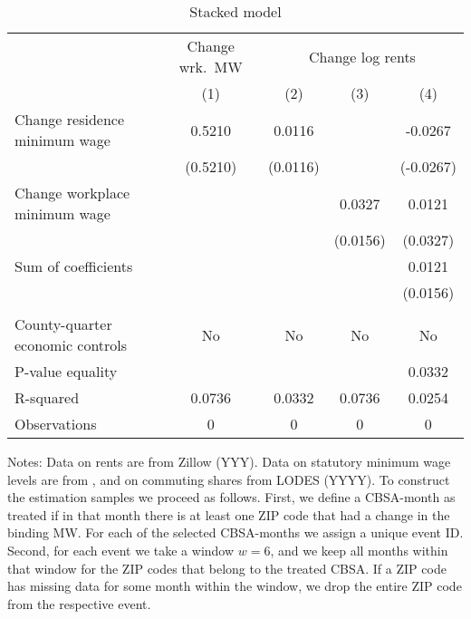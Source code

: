 \begin{table}[hbt!] \centering
	\caption{Stacked model}
	\label{tab:stacked}
	\begin{tabular}{l*{4}{c}}
		\toprule
		& \multicolumn{1}{c}{Change wrk.\ MW}
		& \multicolumn{3}{c}{Change log rents}                            \\ \cmidrule(lr){2-2}\cmidrule(lr){3-5}
		& (1)   & (2)   & (3)   & (4)      \\ \midrule
		Change residence minimum wage      &  0.5210  &  0.0116  &       &  -0.0267     \\
		& (0.5210) & (0.0116) &       & (-0.0267)    \\
		Change workplace minimum wage      &       &       &  0.0327  & 0.0121      \\
		&       &       & (0.0156) & (0.0327)    \\ \midrule
		Sum of coefficients                &       &       &       &  0.0121     \\
		&       &       &       & (0.0156)    \\
		&       &       &       &          \\ \midrule
		County-quarter economic controls   &  No  & No   & No   & No      \\
		P-value equality                   &       &       &       & 0.0332      \\
		R-squared                          &  0.0736  &  0.0332  &  0.0736  & 0.0254      \\
		Observations                       & 0  & 0  & 0  & 0     \\\bottomrule
	\end{tabular}
    
    \begin{minipage}{.95\textwidth} \footnotesize
        \vspace{2mm}
        Notes: Data on rents are from Zillow (YYY). Data on statutory minimum wage levels
        are from \textcite{VaghulZipperer2016, BerkeleyLaborCenter}, and on 
        commuting shares from LODES (YYYY).
        To construct the estimation samples we proceed as follows.
        First, we define a CBSA-month as treated if in that month there is at least one ZIP 
        code that had a change in the binding MW.
        For each of the selected CBSA-months we assign a unique event ID. 
        Second, for each event we take a window $w = 6$, and we keep all months within that 
        window for the ZIP codes that belong to the treated CBSA.
        If a ZIP code has missing data for some month within the window, we drop the entire 
        ZIP code from the respective event. 
    \end{minipage}
\end{table}
